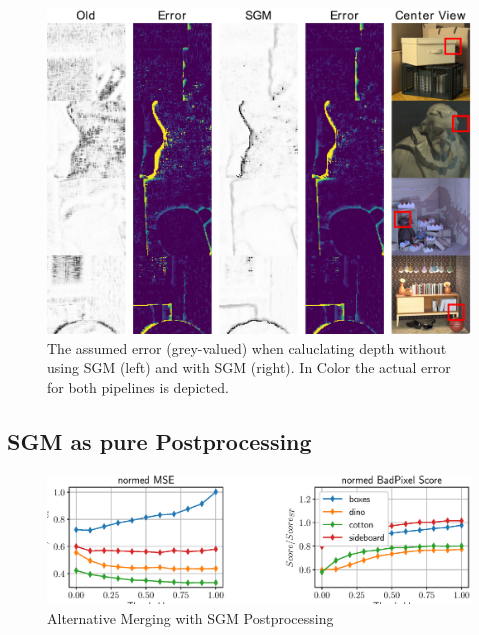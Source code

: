 \documentclass  [
  paper    = a4,
  BCOR     = 10mm,
  twoside,
  fontsize = 12pt,
  fleqn,
  toc      = bibnumbered,
  toc      = listofnumbered,
  numbers  = noendperiod,
  headings = normal,
  listof   = leveldown,
  version  = 3.03
]                                       {scrreprt}
\begin{document}
\begin{figure}
	\centering
	\includegraphics[width=1\linewidth]{images/sgm_coherence_thresh-eps-converted-to}
	\caption[SGM Coherence measure]{The assumed error (grey-valued) when caluclating depth without using SGM (left) and with SGM (right). In Color the actual error for both pipelines is depicted.}
	\label{fig:sgmcoherencethresh}
\end{figure}

\subsection*{SGM as pure Postprocessing}

\begin{figure}
	\centering
	\includegraphics[width=0.7\linewidth]{images/choose_lower_sgm_ppr_20_300_25}
	\caption[Alternative Merging with SGM Postprocessing]{Alternative Merging with SGM Postprocessing}
	\label{fig:chooselowersgmppr2030025}
\end{figure}
\end{document}
